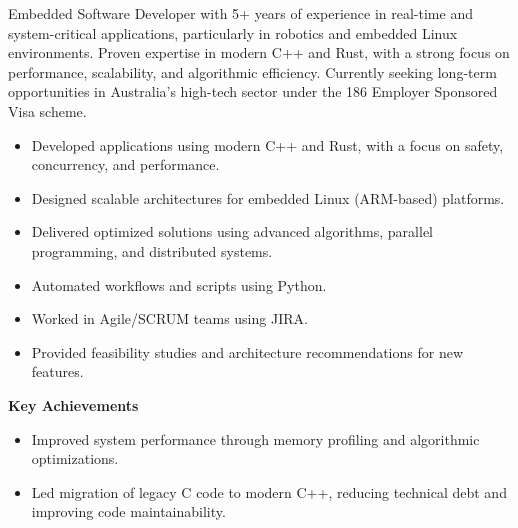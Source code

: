 \documentclass[10pt,a4paper,ragged2e,withhyper]{altacv}
\begin{document}
\begin{paracol}{2}


	{\small
	Embedded Software Developer with 5+ years of experience in real-time and system-critical applications,
	particularly in robotics and embedded Linux environments. Proven expertise in modern C++ and Rust, with a
	strong focus on performance, scalability, and algorithmic efficiency. Currently seeking long-term opportunities
	in Australia’s high-tech sector under the 186 Employer Sponsored Visa scheme.	
	}


	\begin{itemize}
		\item Developed applications using modern C++ and Rust, with a focus on safety, concurrency, and performance.
		\item Designed scalable architectures for embedded Linux (ARM-based) platforms.
		\item Delivered optimized solutions using advanced algorithms, parallel programming, and distributed systems.
		\item Automated workflows and scripts using Python.
		\item Worked in Agile/SCRUM teams using JIRA.
		\item Provided feasibility studies and architecture recommendations for new features.
	\end{itemize}

	\vspace{0.5em}
	{\color{accent}\textbf{\large Key Achievements}}
	\vspace{0.3em}
	\begin{itemize}
		\item Improved system performance through memory profiling and algorithmic optimizations.
		\item Led migration of legacy C code to modern C++, reducing technical debt and improving code maintainability.
	\end{itemize}

	\divider


\end{paracol}
\end{document}
